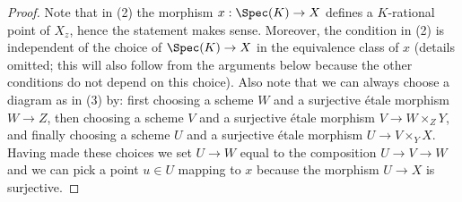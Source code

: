 \begin{proof}
Note that in (2) the morphism $x : \Spec(K) \to X$ defines a
$K$-rational point of $X_z$, hence the statement makes sense. Moreover,
the condition in (2) is independent of the choice of $\Spec(K) \to X$
in the equivalence class of $x$ (details omitted; this will also follow
from the arguments below because the other conditions do not depend
on this choice). Also note that we can always choose a diagram as in
(3) by: first choosing
a scheme $W$ and a surjective \'etale morphism $W \to Z$, then choosing
a scheme $V$ and a surjective \'etale morphism $V \to W \times_Z Y$, and
finally choosing a scheme $U$ and a surjective \'etale morphism
$U \to V \times_Y X$. Having made these choices we set $U \to W$ equal
to the composition $U \to V \to W$ and we can pick a point $u \in U$ mapping
to $x$ because the morphism $U \to X$ is surjective.


\end{proof}

